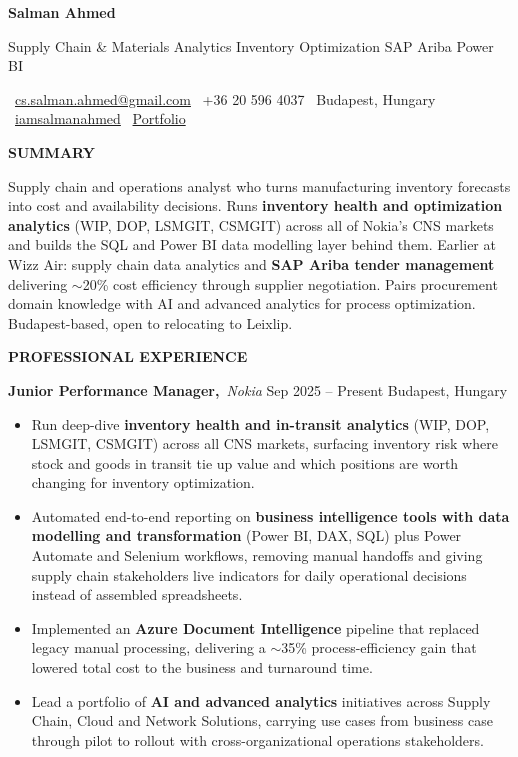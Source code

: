 \documentclass[10pt,a4paper]{article}
\newcommand{\cvsection}[2]{%
  \needspace{2\baselineskip}%
  \vspace{2pt}%
  {\color{accent}\large\bfseries #1\hspace{6pt}#2}\par
  \vspace{-5pt}{\color{accent}\rule{\linewidth}{0.9pt}}\par
  \vspace{2pt}%
}
\newcommand{\cventry}[4]{%
  \needspace{3\baselineskip}%
  {\parfillskip=0pt\relax
   \textbf{#1,}\ {\itshape\color{accent}#2}\hfill
   {\color{dim}#3 \textbar{} #4}\par}%
  \vspace{1pt}%
}
\newenvironment{cvbullets}{%
  \begin{itemize}[leftmargin=1.35em,itemsep=1pt,parsep=0pt,topsep=1pt,%
                  label={\color{accent}\small\textbullet}]
}{%
  \end{itemize}%
}
\newcommand{\contactsep}{\hspace{7pt}}
\begin{document}
{\centering
  {\color{accent}\fontsize{24}{28}\selectfont\bfseries Salman Ahmed}\par
  \vspace{2pt}
  {\color{dim}\normalsize Supply Chain \& Materials Analytics \textbar{} Inventory Optimization \textbar{} SAP Ariba \textbar{} Power BI}\par
  \vspace{3pt}
  {\small
    \faEnvelope\ \href{mailto:cs.salman.ahmed@gmail.com}{cs.salman.ahmed@gmail.com}\contactsep
    \faPhone*\ +36 20 596 4037\contactsep
    \faMapMarker*\ Budapest, Hungary\contactsep
    \faLinkedin\ \href{https://www.linkedin.com/in/iamsalmanahmed}{iamsalmanahmed}\contactsep
    \faGlobe\ \href{https://salman.wuaze.com/?i=1}{Portfolio}%
  }\par
}
\vspace{2pt}

\cvsection{\faUserTie}{SUMMARY}
Supply chain and operations analyst who turns manufacturing inventory forecasts into cost and availability decisions. Runs \textbf{inventory health and optimization analytics} (WIP, DOP, LSMGIT, CSMGIT) across all of Nokia's CNS markets and builds the SQL and Power BI data modelling layer behind them. Earlier at Wizz Air: supply chain data analytics and \textbf{SAP Ariba tender management} delivering $\sim$20\% cost efficiency through supplier negotiation. Pairs procurement domain knowledge with AI and advanced analytics for process optimization. Budapest-based, open to relocating to Leixlip.

\cvsection{\faBriefcase}{PROFESSIONAL EXPERIENCE}

\cventry{Junior Performance Manager}{Nokia}{Sep 2025 -- Present}{Budapest, Hungary}
\begin{cvbullets}
  \item Run deep-dive \textbf{inventory health and in-transit analytics} (WIP, DOP, LSMGIT, CSMGIT) across all CNS markets, surfacing inventory risk where stock and goods in transit tie up value and which positions are worth changing for inventory optimization.
  \item Automated end-to-end reporting on \textbf{business intelligence tools with data modelling and transformation} (Power BI, DAX, SQL) plus Power Automate and Selenium workflows, removing manual handoffs and giving supply chain stakeholders live indicators for daily operational decisions instead of assembled spreadsheets.
  \item Implemented an \textbf{Azure Document Intelligence} pipeline that replaced legacy manual processing, delivering a $\sim$35\% process-efficiency gain that lowered total cost to the business and turnaround time.
  \item Lead a portfolio of \textbf{AI and advanced analytics} initiatives across Supply Chain, Cloud and Network Solutions, carrying use cases from business case through pilot to rollout with cross-organizational operations stakeholders.
\end{cvbullets}
\vspace{1pt}
\end{document}
